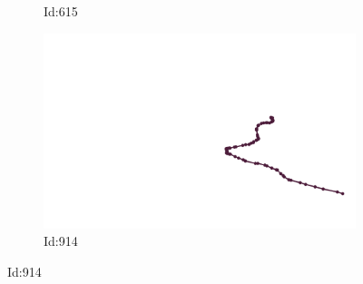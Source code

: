 \documentclass[12pt,twoside]{report}
\begin{document}
\begin{figure}
\begin{subfigure}[b]{0.20\textwidth}
\caption{Id:615}
\end{subfigure}
\begin{subfigure}[b]{0.20\textwidth}
\centering
\includegraphics[width=\textwidth]{../../trajectories/914.png}
\caption{Id:914}
\end{subfigure}
\end{figure}
\end{document}
